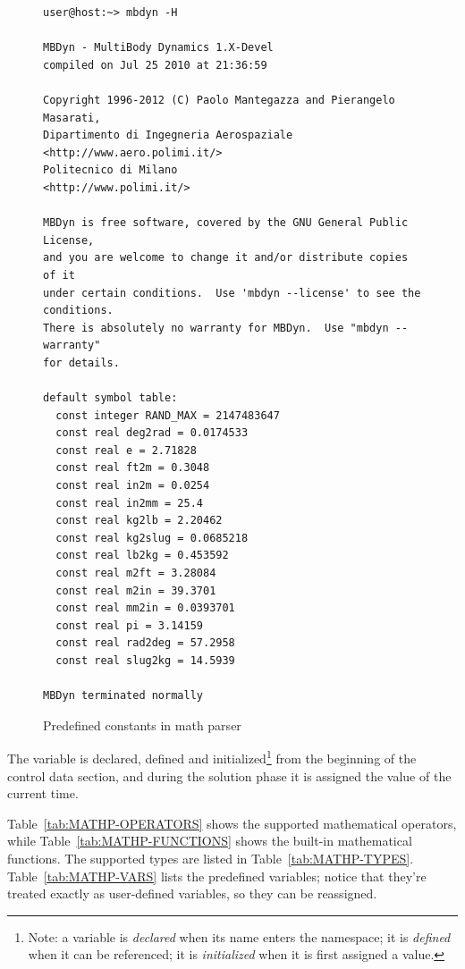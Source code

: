 \begin{figure}
\label{fig:MBDYN-H}
\centering
\small
\begin{minipage}{120mm}
\begin{verbatim}
user@host:~> mbdyn -H

MBDyn - MultiBody Dynamics 1.X-Devel
compiled on Jul 25 2010 at 21:36:59

Copyright 1996-2012 (C) Paolo Mantegazza and Pierangelo Masarati,
Dipartimento di Ingegneria Aerospaziale <http://www.aero.polimi.it/>
Politecnico di Milano                   <http://www.polimi.it/>

MBDyn is free software, covered by the GNU General Public License,
and you are welcome to change it and/or distribute copies of it
under certain conditions.  Use 'mbdyn --license' to see the conditions.
There is absolutely no warranty for MBDyn.  Use "mbdyn --warranty"
for details.

default symbol table:
  const integer RAND_MAX = 2147483647
  const real deg2rad = 0.0174533
  const real e = 2.71828
  const real ft2m = 0.3048
  const real in2m = 0.0254
  const real in2mm = 25.4
  const real kg2lb = 2.20462
  const real kg2slug = 0.0685218
  const real lb2kg = 0.453592
  const real m2ft = 3.28084
  const real m2in = 39.3701
  const real mm2in = 0.0393701
  const real pi = 3.14159
  const real rad2deg = 57.2958
  const real slug2kg = 14.5939

MBDyn terminated normally
\end{verbatim}
\end{minipage}
\caption{Predefined constants in math parser}
\end{figure}

The variable  is declared, defined and initialized\footnote{
    Note: a variable is \emph{declared} when its name enters the namespace;
    it is \emph{defined} when it can be referenced;
    it is \emph{initialized} when it is first assigned a value.
} from the beginning of the control data section, and during the solution 
phase it is assigned the value of the current time. 

Table~\ref{tab:MATHP-OPERATORS} shows the supported mathematical 
operators, while Table~\ref{tab:MATHP-FUNCTIONS} shows the built-in
mathematical functions.
The supported types are listed in Table~\ref{tab:MATHP-TYPES}.
Table~\ref{tab:MATHP-VARS} lists the predefined variables; notice
that they're treated exactly as user-defined variables, so they 
can be reassigned.

